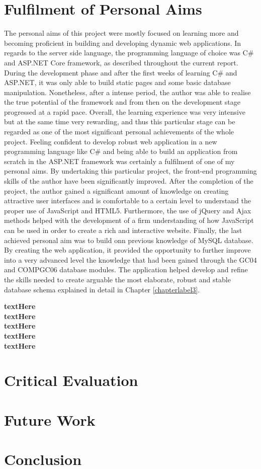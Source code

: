 \section{Fulfilment of Personal Aims}

The personal aims of this project were mostly focused on learning more and becoming proficient in building and developing dynamic web applications. In regards to the server side language, the programming language of choice was C\# and ASP.NET Core framework, as described throughout the current report. During the development phase and after the first weeks of learning C\# and ASP.NET, it was only able to build static pages and some basic database manipulation. Nonetheless, after a intense period, the author was able to realise the true potential of the framework and from then on the development stage progressed at a rapid pace. Overall, the learning experience was very intensive but at the same time very rewarding, and thus this particular stage can be regarded as one of the most significant personal achievements of the whole project. Feeling confident to develop robust web application in a new programming language like C\# and being able to build an application from scratch in the ASP.NET framework was certainly a fulfilment of one of my personal aims. By undertaking this particular project, the front-end programming skills of the author have been significantly improved. After the completion of the project, the author gained a significant amount of knowledge on creating attractive user interfaces and is comfortable to a certain level to understand the proper use of JavaScript and HTML5. Furthermore, the use of jQuery and Ajax methods helped with the development of a firm understanding of how JavaScript can be used in order to create a rich and interactive website. Finally, the last achieved personal aim was to build onn previous knowledge of MySQL database. By creating the web application, it provided the opportunity to further improve into a very advanced level the knowledge that had been gained through the GC04 and COMPGC06 database modules. The application helped develop and refine the skills needed to create arguable the most elaborate, robust and stable database schema explained in detail in Chapter \ref{chapterlabel3}.


\textbf{textHere}\\

\textbf{textHere}\\

\textbf{textHere}\\

\textbf{textHere}\\

\textbf{textHere}\\




\section{Critical Evaluation}


\section{Future Work}


\section{Conclusion}



